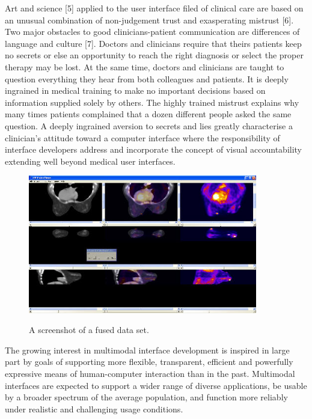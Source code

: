 Art and science [5] applied to the user interface filed of clinical care are based on an unusual combination of non-judgement trust and exasperating mistrust [6]. Two major obstacles to good clinicians-patient communication are differences of language and culture [7]. Doctors and clinicians require that theirs patients keep no secrets or else an opportunity to reach the right diagnosis or select the proper therapy may be lost. At the same time, doctors and clinicians are taught to question everything they hear from both colleagues and patients. It is deeply ingrained in medical training to make no important decisions based on information supplied solely by others. The highly trained mistrust explains why many times patients complained that a dozen different people asked the same question. A deeply ingrained aversion to secrets and lies greatly characterise a clinician’s attitude toward a computer interface where the responsibility of interface developers address and incorporate the concept of visual accountability extending well beyond medical user interfaces.

\clearpage

\begin{figure}[!hbt]
\centering
\includegraphics[width=10cm]{images/multimodalbreastimage}~\\
\caption{\label{fig:screenshot}A screenshot of a fused data set.
}
\end{figure}

The growing interest in multimodal interface development is inspired in large part by goals of supporting more flexible, transparent, efficient and powerfully expressive means of human-computer interaction than in the past. Multimodal interfaces are expected to support a wider range of diverse applications, be usable by a broader spectrum of the average population, and function more reliably under realistic and challenging usage conditions.

